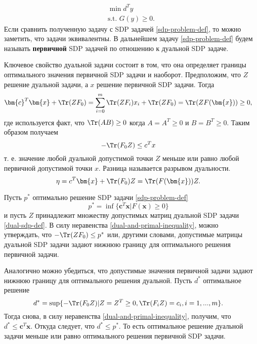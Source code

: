 \begin{equation}
\begin{split}
    & \min d^T y \\
    & \text{s.t. } G(y) \geq 0.
\end{split}
\end{equation}
Если сравнить полученную задачу с SDP задачей \ref{sdp-problem-def}, то можно заметить, что задачи эквивалентны. В дальнейшем задачу \ref{sdp-problem-def} будем называть \textbf{первичной} SDP задачей по отношению к дуальной SDP задаче.

Ключевое свойство дуальной задачи состоит в том, что она определяет границы оптимального значения первичной SDP задачи и наоборот. Предположим, что $Z$ решение дуальной задачи, а $x$ решение первичной SDP задачи. Тогда
\begin{equation}
    \bm{c}^T \bm{x} + \Tr(ZF_0) = \sum\limits_{i=0}^{m} \Tr(ZF_i)x_i + \Tr(ZF_0) = \Tr(ZF(\bm{x})) \geq 0,
\end{equation}
где используется факт, что $\Tr(AB) \geq 0$ когда $A = A^T \geq 0$ и  $B = B^T \geq 0$. Таким образом получаем
\begin{equation}\label{dual-and-primal-inequality}
    -\Tr(F_0Z) \leq c^Tx
\end{equation}
т. е. значение любой дуальной допустимой точки $Z$ меньше или равно любой первичной допустимой точки $x$.
Разница называется разрывом дуальности.
\begin{equation}
    \eta = c^T \bm{x} + \Tr(F_0)Z = \Tr(F(\bm{x}))Z.
\end{equation}

Пусть $p^*$ оптимально решение SDP задачи \ref{sdp-problem-def}
\begin{equation}
    p^* = \inf \{\bm{c}^T\bm{x} | F(\bm{x}) \geq 0\}
\end{equation}
и пусть $Z$ принадлежит множеству допустимых матриц дуальной SDP задачи \ref{dual-sdp-def}.
В силу неравенства \ref{dual-and-primal-inequality}, можно утверждать, что
$-\Tr(Z F_0) \leq p^*$ или, другими словами, допустимые матрицы дуальной SDP задачи задают нижнюю границу
для оптимального решения первичной задачи.

Аналогично можно убедиться, что допустимые значения первичной задачи задают нижнюю границу для оптимального решения дуальной.
Пусть $d^*$ оптимальное решение 
\begin{equation}
    d^* = \sup \{ -\Tr(F_0 Z) | Z = Z^T \geq 0, \Tr(F_i Z) = c_i, i=1, ...,m \}.
\end{equation}
Тогда снова, в силу неравенства \ref{dual-and-primal-inequality}, получим, что $d^* \leq \bm{c}^T \bm{x}$.
Откуда следует, что $d^* \leq p^*$. То есть оптимальное решение дуальной задачи меньше или равно оптимального решения
первичной SDP задачи.

